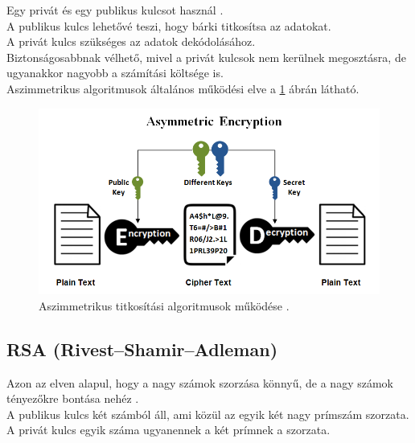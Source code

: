\noindent Egy privát és egy publikus kulcsot használ \cite{yassein2017comprehensive}.
\vspace{5pt} \\A publikus kulcs lehetővé teszi, hogy bárki titkosítsa az adatokat.
\vspace{5pt} \\A privát kulcs szükséges az adatok  dekódolásához. 
\vspace{5pt} \\Biztonságosabbnak vélhető, mivel a privát kulcsok nem kerülnek megosztásra, de u\-gyan\-ak\-kor nagyobb a számítási költsége is.\newline
\vspace{5pt}\\ Aszimmetrikus algoritmusok általános működési elve a \ref{fig:asym_encryption} ábrán látható.
\begin{figure}[h]
	\centering
	\includegraphics[scale=0.5]{images/asym.png}
	\caption{Aszimmetrikus titkosítási algoritmusok működése \cite{ssl2buywiki}.}
	\label{fig:asym_encryption}
\end{figure}

\subsection{RSA (Rivest–Shamir–Adleman)}
\noindent Azon az elven alapul, hogy a nagy számok szorzása könnyű, de a nagy számok tényezőkre bontása nehéz \cite{gupta2011ecc}. 
\vspace{5pt}\\ A publikus kulcs két számból áll, ami közül az egyik két nagy prímszám szorzata.
\vspace{5pt}\\ A privát kulcs egyik száma ugyanennek a két prímnek a szorzata.


